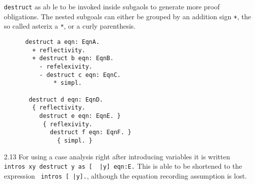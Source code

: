 	 \lstinline!destruct! as ab le to be invoked inside subgaols to generate more proof obligations.
	  The nested subgoals can either be grouped by an addition sign \lstinline!+!, the so called asterix a \lstinline!*!, or a curly parenthesis.
	  \begin{example}
	  \begin{lstlisting}
	  destruct a eqn: EqnA.
	    + reflectivity.
	    + destruct b eqn: EqnB.
	      - refelexivity.
	      - destruct c eqn: EqnC.
	          * simpl.        
	  
	   destruct d eqn: EqnD.
	    { reflectivity.
	      destruct e eqn: EqnE. } 
	       { reflexivity.
	         destruct f eqn: EqnF. } 
	           { simpl. }   
	   \end{lstlisting}
	   \end{example}     
	 2.13 
	  For using a case analysis right after introducing variables it is written
	  \lstinline! intros xy destruct y as [  |y] eqn:E.!	
	  This is able to be shortened to the expression \lstinline! intros [ |y].!, although the equation recording assumption is lost.   
    
   